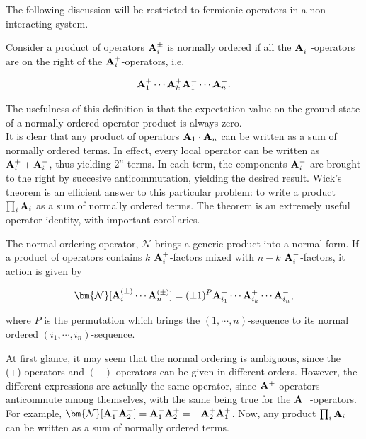 The following discussion will be restricted to 
fermionic operators in a non-interacting system. 

\begin{definition}

Consider a product of operators ${\bf A}_i^{\pm}$ is normally ordered if all the ${\bf A}_i^{-}$-operators are on the right of the ${\bf A}_i^{+}$-operators, i.e.

$$
    {\bf A}_1^{+} \cdots {\bf A}_k^{+} {\bf A}_1^{-} \cdots {\bf A}_n^{-}.
$$

\end{definition}

The usefulness of this definition is that the expectation value on the ground state of a normally ordered operator product is always zero. \\

It is clear that any product of operators ${\bf A}_1 \cdot {\bf A}_n$ can be written as a sum of normally ordered terms. In effect, every local operator can be written as ${\bf A}_i^{+} + {\bf A}_i^{-}$, thus yielding $2^n$ terms. In each term, the components ${\bf A}_i^{-}$ are brought to the right by succesive anticommutation, yielding the desired result. Wick's theorem is an efficient answer to this particular problem: to write a product $\prod_{i} {\bf A}_i$ as a sum of normally ordered terms. The theorem is an extremely useful operator identity, with important corollaries. \\

\begin{definition}
    The normal-ordering operator, $\bm{\mathcal{N}}$ brings a generic product into a normal form. If a product of operators contains $k$ ${\bf A}_i^+$-factors mixed with $n-k$ ${\bf A}^-_i$-factors, it action is given by 
    
    \begin{equation}
        \bm{\mathcal{N}} [{\bf A}_i^{(\pm)} \cdots {\bf A}_n^{(\pm)}] = (\pm 1)^{P} {\bf A}_{i_1}^{+} \cdots {\bf A}_{i_k}^{+} \cdots {\bf A}_{i_n}^{-}, 
    \end{equation}
    
    where $P$ is the permutation which brings the $(1, \cdots,n)$-sequence to its normal ordered $(i_1, \cdots, i_n)$-sequence. \\
\end{definition}

At first glance, it may seem that the normal ordering is ambiguous, since the (+)-operators and $(-)$-operators can be given in different orders. However, the different expressions are actually the same operator, since ${\bf A}^+$-operators anticommute among themselves, with the same being true for the ${\bf A}^-$-operators. For example, $\bm{\mathcal{N}}[{{\bf A}_1^+ {\bf A}_2^+}] = {{\bf A}_1^+ {\bf A}_2^+} = - {{\bf A}_2^+ {\bf A}_1^+}$. Now, any product $\prod_i {\bf A}_i$ can be written as a sum of normally ordered terms. 

